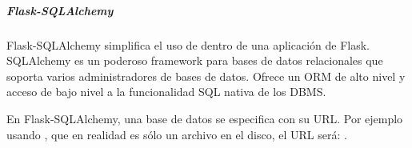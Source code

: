 \begin{sphinxVerbatim}[commandchars=\\\{\}]
     
          
            
          
        \PYG{p}{[}\PYG{p}{]}   \PYG{p}{[}\PYG{p}{]}
         \PYG{p}{[}\PYG{p}{]} 

 
 


   
\end{sphinxVerbatim}


\subparagraph{Flask-SQLAlchemy}
\label{\detokenize{chapter_two/desc_cloudnao:flask-sqlalchemy}}
Flask-SQLAlchemy simplifica el uso de  dentro de una aplicación de
Flask. SQLAlchemy es un  poderoso framework para bases de datos relacionales
que soporta varios administradores de bases de datos. Ofrece un ORM de alto
nivel y acceso de bajo nivel a la funcionalidad SQL nativa de los DBMS.

En Flask-SQLAlchemy, una base de datos se especifica con su URL. Por ejemplo
usando , que en realidad es sólo un archivo en el disco, el URL
será: .

